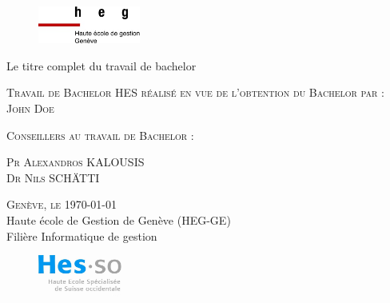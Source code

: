\documentclass[12pt]{article}
\title{\fulltitle}
\author{\authorname}
\date{\today}
\newcommand{\authorname}{John Doe}
\newcommand{\place}{Genève}
\newcommand{\fulltitle}{Le titre complet du travail de bachelor}
\begin{document}
\begin{titlepage}

    \begin{figure}[h]
        \includegraphics[width=0.3\textwidth]{img/logo_heg-ge.jpg}
    \end{figure}

    \vspace*{0.5cm}

    \begin{center}

        \begingroup \linespread{1,75} \selectfont
        {\Large \fulltitle}\\[0,75cm]
        \endgroup



        \vspace{1.5cm}

        \textsc{\large Travail de Bachelor HES réalisé en vue de \newline l’obtention du Bachelor par :}\\[0,50cm]

        \begingroup \linespread{1,5} \selectfont
        \textsc{\large \authorname}\\[0,50cm]
        \endgroup


        \vspace{1cm}


        \textsc{\large Conseillers au travail de Bachelor : }

        \begingroup \linespread{1,5} \selectfont
        \textsc{\large Pr Alexandros KALOUSIS}\\[0.1cm]
        \textsc{\large Dr Nils SCHÄTTI}\\[1cm]
        \endgroup


        \begingroup \linespread{1,75} \selectfont
        \textsc{\large \place, le \today}\\[0,1cm]

        {\large Haute école de Gestion de Genève (HEG-GE)}\\[0,1cm]

        {\large Filière Informatique de gestion}\\[0,1cm]
        \endgroup



        \begin{figure}[h]
            \vspace{0.05cm}
            \hspace*{12cm}\includegraphics[width=0.25\textwidth]{img/logo_hes-so.jpg}
        \end{figure}


\end{center}
\end{titlepage}
\end{document}
